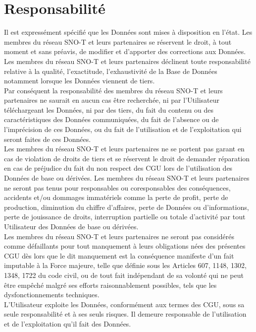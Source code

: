 \documentclass[]{article}
\begin{document}
\section{Responsabilité}

Il est expressément spécifié que les Données sont mises à disposition en l’état. Les membres du réseau SNO-T et leurs partenaires se réservent le droit, à tout moment et sans préavis, de modifier et d’apporter des corrections aux Données. Les membres du réseau SNO-T et leurs partenaires déclinent toute responsabilité relative à la qualité, l’exactitude, l’exhaustivité de la Base de Données notamment lorsque les Données viennent de tiers.\\

Par conséquent la responsabilité des membres du réseau SNO-T et leurs partenaires ne saurait en aucun cas être recherchée, ni par l’Utilisateur téléchargeant les Données, ni par des tiers, du fait du contenu ou des caractéristiques des Données communiquées, du fait de l’absence ou de l’imprécision de ces Données, ou du fait de l’utilisation et de l’exploitation qui seront faites de ces Données.\\

Les membres du réseau SNO-T et leurs partenaires ne se portent pas garant en cas de violation de droits de tiers et se réservent le droit de demander réparation en cas de préjudice du fait du non respect des CGU lors de l’utilisation des Données de base ou dérivées.
Les membres du réseau SNO-T et leurs partenaires ne seront pas tenus pour responsables ou coresponsables des conséquences, accidents et/ou dommages immatériels comme la perte de profit, perte de production, diminution du chiffre d’affaires, perte de Données ou d’informations, perte de jouissance de droits, interruption partielle ou totale d’activité par tout Utilisateur des Données de base ou dérivées.\\

Les membres du réseau SNO-T et leurs partenaires ne seront pas considérés comme défaillants pour tout manquement à leurs obligations nées des présentes CGU dès lors que le dit manquement est la conséquence manifeste d’un fait imputable à la Force majeure, telle que définie sous les Articles 607, 1148, 1302, 1348, 1722 du code civil, ou de tout fait indépendant de sa volonté qui ne peut être empêché malgré ses efforts raisonnablement possibles, tels que les dysfonctionnements techniques.\\

L’Utilisateur exploite les Données, conformément aux termes des CGU, sous sa seule responsabilité et à ses seuls risques. Il demeure responsable de l’utilisation et de l’exploitation qu’il fait des Données.
\end{document}
